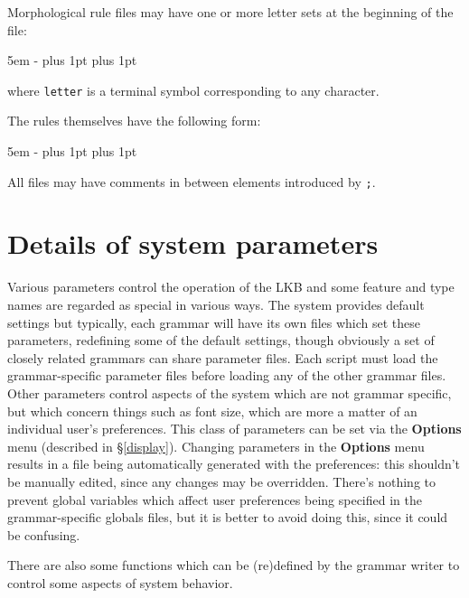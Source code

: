 \documentclass[12pt]{report}
\begin{document}
Morphological rule files may have one or more letter sets at the 
beginning of the file:
\begin{list}{}
   {\leftmargin 5em
    \itemindent -\leftmargin
    \itemsep 0pt plus 1pt
    \parsep 0pt plus 1pt}
\end{list}
where {\tt letter} is a terminal symbol corresponding to any character.

The rules themselves have the following form:
\begin{list}{}
   {\leftmargin 5em
    \itemindent -\leftmargin
    \itemsep 0pt plus 1pt
    \parsep 0pt plus 1pt}
\end{list}

All files may have comments in between elements introduced by {\tt ;}.


\chapter{Details of system parameters}
\label{glob}

Various parameters control the operation of the LKB and some feature and
type names are regarded as special in various ways.
The system provides default settings
but typically, each grammar will have its own files which set these
parameters, redefining some of the default settings, though
obviously a set of closely related grammars can share parameter
files.  Each script must load the grammar-specific parameter files
before loading any of the other grammar files.
Other parameters control aspects of the system which
are not grammar specific, but which concern things such as 
font size, which are more a matter of an individual user's preferences.
This class of parameters can be set via the {\bf Options}
menu (described in \S\ref{display}).
Changing parameters in the {\bf Options} menu results in
a file being automatically generated with the preferences:
this shouldn't be manually edited, since any changes may be 
overridden.  There's nothing to prevent global variables which affect
user preferences being specified in the grammar-specific globals
files, but it is better to avoid doing this, since it could be confusing.

There are also some functions which can be (re)defined
by the grammar writer to control some aspects of system behavior.
\end{document}
